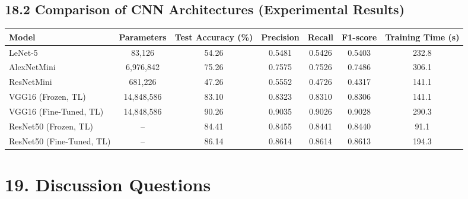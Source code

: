 \documentclass[11pt]{article}
\begin{document}
\vspace{5mm}

\subsection*{18.2 Comparison of CNN Architectures (Experimental Results)}

\begin{center}

\begin{tabular}{|l|c|c|c|c|c|c|}

\hline

Model &
Parameters &
Test Accuracy (\%) &
Precision &
Recall &
F1-score &
Training Time (s)\\

\hline

LeNet-5  & 83{,}126 & 54.26 & 0.5481 & 0.5426 & 0.5403 & 232.8\\

\hline

AlexNetMini & 6{,}976{,}842 & 75.26 & 0.7575 & 0.7526 & 0.7486 & 306.1\\

\hline

ResNetMini & 681{,}226 & 47.26 & 0.5552 & 0.4726 & 0.4317 & 141.1\\

\hline

VGG16 (Frozen, TL) & 14{,}848{,}586 & 83.10 & 0.8323 & 0.8310 & 0.8306 & 141.1\\

\hline

VGG16 (Fine-Tuned, TL) & 14{,}848{,}586 & 90.26 & 0.9035 & 0.9026 & 0.9028 & 290.3\\

\hline

ResNet50 (Frozen, TL) & -- & 84.41 & 0.8455 & 0.8441 & 0.8440 & 91.1\\

\hline

ResNet50 (Fine-Tuned, TL) & -- & 86.14 & 0.8614 & 0.8614 & 0.8613 & 194.3\\

\hline

\end{tabular}

\end{center}


\section*{19. Discussion Questions}
\end{document}
